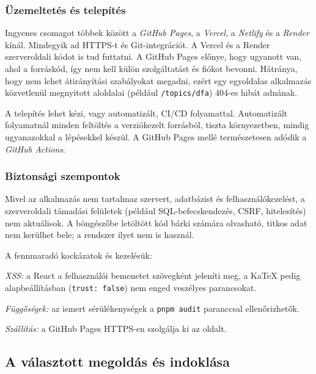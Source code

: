 \subsubsection{Üzemeltetés és telepítés}

Ingyenes csomagot többek között a \emph{GitHub Pages}, a
\emph{Vercel}, a \emph{Netlify} és a \emph{Render} kínál. 
 Mindegyik ad HTTPS-t és
Git-integrációt. A Vercel és a Render szerveroldali kódot is tud
futtatni. A GitHub Pages előnye, hogy
ugyanott van, ahol a forráskód, így nem kell külön szolgáltatást és
fiókot bevonni. Hátránya, hogy nem lehet átirányítási szabályokat
megadni, ezért egy egyoldalas alkalmazás közvetlenül megnyitott
aloldalai (például \texttt{/topics/dfa}) 404-es hibát adnának.

A telepítés lehet kézi, vagy automatizált, CI/CD folyamattal. Automatizált
folyamatnál minden feltöltés a verziókezelt forrásból, tiszta
környezetben, mindig ugyanazokkal a lépésekkel készül. A GitHub
Pages mellé természetesen adódik a \emph{GitHub Actions}.



\subsubsection{Biztonsági szempontok}

Mivel az alkalmazás nem tartalmaz szervert, adatbázist és
felhasználókezelést, a szerveroldali támadási felületek (például
SQL-befecskendezés, CSRF, hitelesítés) nem aktuálisok. A böngészőbe
letöltött kód bárki számára olvasható, titkos adat nem kerülhet bele; a rendszer ilyet nem is használ.

A fennmaradó kockázatok és kezelésük:
\begin{compactitem}
    \item \emph{XSS:} a React a felhasználói bemenetet szövegként
          jeleníti meg, a KaTeX pedig alapbeállításban
          (\texttt{trust: false}) nem enged veszélyes parancsokat.
    \item \emph{Függőségek:} az ismert sérülékenységek a
          \texttt{pnpm audit} paranccsal ellenőrizhetők.
    \item \emph{Szállítás:} a GitHub Pages HTTPS-en szolgálja ki az
          oldalt.
\end{compactitem}

\subsection{A választott megoldás és indoklása}
\label{sec:tech-choice}


